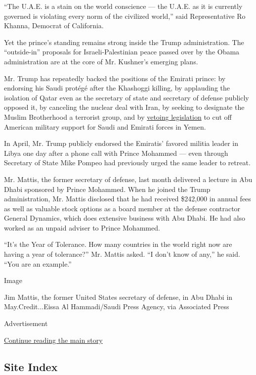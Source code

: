 ``The U.A.E. is a stain on the world conscience --- the U.A.E. as it is
currently governed is violating every norm of the civilized world,''
said Representative Ro Khanna, Democrat of California.

Yet the prince's standing remains strong inside the Trump
administration. The ``outside-in'' proposals for Israeli-Palestinian
peace passed over by the Obama administration are at the core of Mr.
Kushner's emerging plans.

Mr. Trump has repeatedly backed the positions of the Emirati prince: by
endorsing his Saudi protégé after the Khashoggi killing, by applauding
the isolation of Qatar even as the secretary of state and secretary of
defense publicly opposed it, by canceling the nuclear deal with Iran, by
seeking to designate the Muslim Brotherhood a terrorist group, and by
\href{https://www.nytimes.com/2019/04/16/us/politics/trump-veto-yemen.html}{vetoing
legislation} to cut off American military support for Saudi and Emirati
forces in Yemen.

In April, Mr. Trump publicly endorsed the Emiratis' favored militia
leader in Libya one day after a phone call with Prince Mohammed --- even
through Secretary of State Mike Pompeo had previously urged the same
leader to retreat.

Mr. Mattis, the former secretary of defense, last month delivered a
lecture in Abu Dhabi sponsored by Prince Mohammed. When he joined the
Trump administration, Mr. Mattis disclosed that he had received
\$242,000 in annual fees as well as valuable stock options as a board
member at the defense contractor General Dynamics, which does extensive
business with Abu Dhabi. He had also worked as an unpaid adviser to
Prince Mohammed.

``It's the Year of Tolerance. How many countries in the world right now
are having a year of tolerance?'' Mr. Mattis asked. ``I don't know of
any,'' he said. ``You are an example.''

Image

Jim Mattis, the former United States secretary of defense, in Abu Dhabi
in May.Credit...Eissa Al Hammadi/Saudi Press Agency, via Associated
Press

Advertisement

\protect\hyperlink{after-bottom}{Continue reading the main story}

\hypertarget{site-index}{%
\subsection{Site Index}\label{site-index}}

